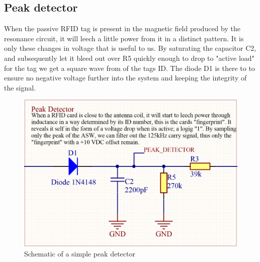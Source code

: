 \newpage\newpage
\subsection{Peak detector}
When the passive RFID tag is present in the magnetic field produced by the resonance circuit, it will leech a little power from it in a distinct pattern. It is only these changes in voltage that is useful to us. By saturating the capacitor C2, and subsequently let it bleed out over R5  quickly enough to drop to "active load" for the tag we get a square wave from of the tags ID. The diode D1 is there to to ensure no negative voltage further into the system and keeping the integrity of the signal.

\begin{figure}[h]
    \centering
    \includegraphics[width=\textwidth]{05_My_Implementation/figures/Peak_detector.png}
    \caption{Schematic of a simple peak detector}
    \label{fig:05:peak}
\end{figure}
\clearpage
